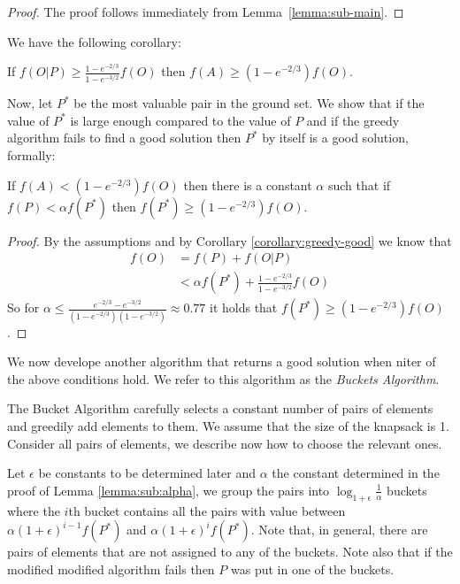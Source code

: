 \begin{proof}
	The proof follows immediately from Lemma~\ref{lemma:sub-main}.
\end{proof}

We have the following corollary:
\begin{corollary}
	\label{corollary:greedy-good}
	If $f(O|P) \geq \frac{1-e^{-2/3}}{1-e^{-3/2}}f(O)$ then $f(A) \geq (1 - e^{-2/3})f(O)$.
\end{corollary}

Now, let $P^*$ be the most valuable pair in the ground set.
We show that if the value of $P^*$ is large enough compared to the value of $P$ and if the greedy algorithm fails to find a good solution then $P^*$ by itself is a good solution, formally:

\begin{lemma}
	\label{lemma:sub:alpha}
	If $f(A) < (1 - e^{-2/3})f(O)$ then there is a constant $\alpha$ such that if $f(P) < \alpha f(P^*)$ then $f(P^*) \geq (1 - e^{-2/3})f(O)$.
\end{lemma}

\begin{proof}
	By the assumptions and by Corollary \ref{corollary:greedy-good} we know that 
	\begin{align}
		f(O)	& = f(P) + f(O|P) 
		\\ 		& < \alpha f(P^*) + \frac{1-e^{-2/3}}{1-e^{-3/2}}f(O)
	\end{align}
	So for $\alpha \leq \frac{e^{-2/3} - e^{-3/2}}{(1-e^{-2/3})(1-e^{-3/2})} \approx 0.77$ it holds that $f(P^*) \geq (1 - e^{-2/3})f(O)$.
\end{proof}

We now develope another algorithm that returns a good solution when niter of the above conditions hold.
We refer to this algorithm as the \emph{Buckets Algorithm}.

The Bucket Algorithm carefully selects a constant number of pairs of elements and greedily add elements to them.
We assume that the size of the knapsack is 1.
Consider all pairs of elements, we describe now how to choose the relevant ones.

Let $\epsilon$ be constants to be determined later and $\alpha$ the constant determined in the proof of Lemma \ref{lemma:sub:alpha},
we group the pairs into $\log_{1 + \epsilon}\frac{1}{\alpha}$ buckets where the $i$th bucket contains all the pairs with value
between $\alpha (1 + \epsilon)^{i - 1}f(P^*)$ and $\alpha (1 + \epsilon)^{i}f(P^*)$.
Note that, in general, there are pairs of elements that are not assigned to any of the buckets.
Note also that if the modified modified algorithm fails then $P$ was put in one of the buckets.

